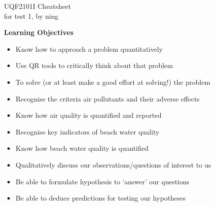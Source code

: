 \documentclass{article}
\newcommand{\headingsmall}[1]{{\small\textbf{#1}}}
\begin{document}
\scriptsize                %
\setlength\parindent{0pt}  %

\begin{center}
{\large UQF2101I Cheatsheet}\\{for test 1, by ning}
\end{center}

\begin{multicols*}{4}

\headingsmall{Learning Objectives}
\begin{itemize} \itemsep -0.5em
    \item Know how to approach a problem quantitatively
    \item Use QR tools to critically think about that problem
    \item To solve (or at least make a good effort at solving!) the problem
    \item Recognise the criteria air pollutants and their adverse effects
    \item Know how air quality is quantified and reported
    \item Recognise key indicators of beach water quality
    \item Know how beach water quality is quantified
    \item Qualitatively discuss our observations/questions of interest to us
    \item Be able to formulate hypothesis to `answer' our questions
    \item Be able to deduce predictions for testing our hypotheses
\end{itemize}


\end{multicols*}
\end{document}

